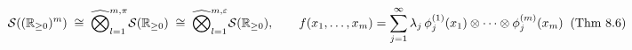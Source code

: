 \documentclass[preview]{standalone}
\begin{document}
\begin{align*}
\special{dvisvgm:raw <g id='unique000'>}\mathcal{S}\!\left((\mathbb{R}_{\ge 0})^m\right) \;\cong\; \widehat{\bigotimes}_{l=1}^{m,\pi} \mathcal{S}(\mathbb{R}_{\ge 0}) \;\cong\; \widehat{\bigotimes}_{l=1}^{m,\varepsilon} \mathcal{S}(\mathbb{R}_{\ge 0}), \qquad f(x_1,\dots,x_m) = \sum_{j=1}^\infty \lambda_j\,\phi_j^{(1)}(x_1)\otimes\cdots\otimes\phi_j^{(m)}(x_m)\;\;(\text{Thm 8.6})\special{dvisvgm:raw </g>}
\end{align*}
\end{document}
